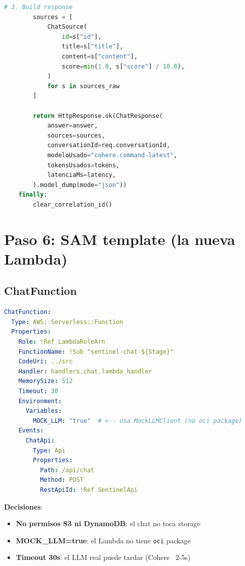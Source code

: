 \documentclass[11pt,a4paper,oneside]{article}
\newcommand{\ok}{\textcolor{okgreen}{\textbf{\checkmark}}}
\begin{document}
\begin{lstlisting}[language=Python,caption={src/handlers/chat.py (handler)}]
        # 3. Build response
        sources = [
            ChatSource(
                id=s["id"],
                title=s["title"],
                content=s["content"],
                score=min(1.0, s["score"] / 10.0),
            )
            for s in sources_raw
        ]

        return HttpResponse.ok(ChatResponse(
            answer=answer,
            sources=sources,
            conversationId=req.conversationId,
            modeloUsado="cohere.command-latest",
            tokensUsados=tokens,
            latenciaMs=latency,
        ).model_dump(mode="json"))
    finally:
        clear_correlation_id()
\end{lstlisting}

\section{Paso 6: SAM template (la nueva Lambda)}

\subsection{ChatFunction}

\begin{lstlisting}[language=yaml,caption={infra/template.yaml — ChatFunction}]
ChatFunction:
  Type: AWS::Serverless::Function
  Properties:
    Role: !Ref LambdaRoleArn
    FunctionName: !Sub "sentinel-chat-${Stage}"
    CodeUri: ../src
    Handler: handlers.chat.lambda_handler
    MemorySize: 512
    Timeout: 30
    Environment:
      Variables:
        MOCK_LLM: "true"  # <-- usa MockLLMClient (no oci package)
    Events:
      ChatApi:
        Type: Api
        Properties:
          Path: /api/chat
          Method: POST
          RestApiId: !Ref SentinelApi
\end{lstlisting}

\textbf{Decisiones}:
\begin{itemize}
  \item \ok \textbf{No permisos S3 ni DynamoDB}: el chat no toca storage
  \item \ok \textbf{MOCK\_LLM=true}: el Lambda no tiene \texttt{oci} package
  \item \ok \textbf{Timeout 30s}: el LLM real puede tardar (Cohere ~2-5s)
\end{itemize}

\end{document}
